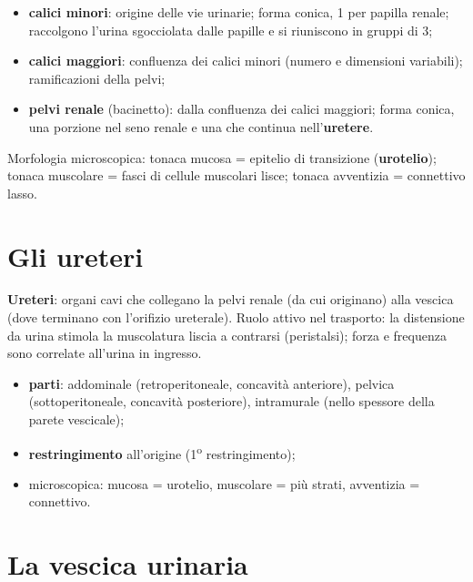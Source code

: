 \begin{itemize}
  \item \textbf{calici minori}: origine delle vie urinarie; forma conica, 1 per papilla renale;
    raccolgono l'urina sgocciolata dalle papille e si riuniscono in gruppi di 3;
  \item \textbf{calici maggiori}: confluenza dei calici minori (numero e dimensioni variabili);
    ramificazioni della pelvi;
  \item \textbf{pelvi renale} (bacinetto): dalla confluenza dei calici maggiori; forma conica, una
    porzione nel seno renale e una che continua nell'\textbf{uretere}.
\end{itemize}
Morfologia microscopica: tonaca mucosa = epitelio di transizione (\textbf{urotelio}); tonaca
muscolare = fasci di cellule muscolari lisce; tonaca avventizia = connettivo lasso.

\section{Gli ureteri}

\textbf{Ureteri}: organi cavi che collegano la pelvi renale (da cui originano) alla vescica (dove
terminano con l'orifizio ureterale). Ruolo attivo nel trasporto: la distensione da urina stimola la
muscolatura liscia a contrarsi (peristalsi); forza e frequenza sono correlate all'urina in ingresso.
\begin{itemize}
  \item \textbf{parti}: addominale (retroperitoneale, concavità anteriore), pelvica
    (sottoperitoneale, concavità posteriore), intramurale (nello spessore della parete vescicale);
  \item \textbf{restringimento} all'origine (1\textsuperscript{o} restringimento);
  \item microscopica: mucosa = urotelio, muscolare = più strati, avventizia = connettivo.
\end{itemize}

\section{La vescica urinaria}

